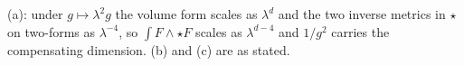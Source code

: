(a): under $g \mapsto \lambda^{2}g$ the volume form scales as $\lambda^{d}$ and the two inverse metrics in $\star$ on two-forms as $\lambda^{-4}$, so $\int F \wedge \star F$ scales as $\lambda^{d-4}$ and $1/g^{2}$ carries the compensating dimension. (b) and (c) are as stated.
